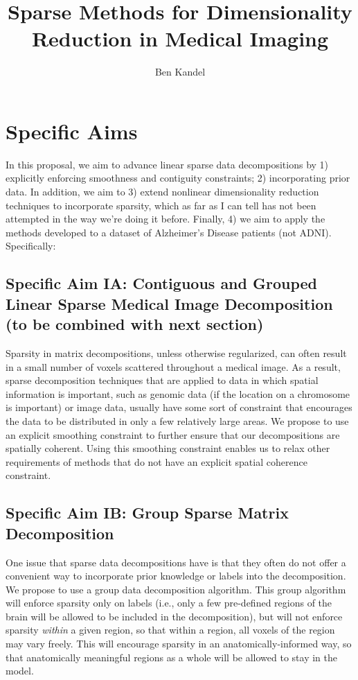 \documentclass{nih}
\date{}
\author{Ben Kandel}
\title{Sparse Methods for Dimensionality Reduction in Medical Imaging}
\begin{document}
\maketitle

\section*{Specific Aims}
In this proposal, we aim to advance linear sparse data decompositions by 1) explicitly enforcing smoothness and contiguity constraints; 2) incorporating prior data.  In addition, we aim to 3) extend nonlinear dimensionality reduction techniques to incorporate sparsity, which as far as I can tell has not been attempted in the way we're doing it before. Finally, 4) we aim to apply the methods developed to a dataset of Alzheimer's Disease patients (not ADNI).  Specifically:
 
\subsection*{Specific Aim IA: Contiguous and Grouped Linear Sparse Medical Image Decomposition (to be combined with next section)} 
Sparsity in matrix decompositions, unless otherwise regularized, can often result in a small number of voxels scattered throughout a medical image.  As a result, sparse decomposition techniques that are applied to data in which spatial information is important, such as genomic data (if the location on a chromosome is important) or image data, usually have some sort of constraint that encourages the data to be distributed in only a few relatively large areas.  We propose to use an explicit smoothing constraint to further ensure that our decompositions are spatially coherent.  Using this smoothing constraint enables us to relax other requirements of methods that do not have an explicit spatial coherence constraint. 
\subsection*{Specific Aim IB: Group Sparse Matrix Decomposition}
One issue that sparse data decompositions have is that they often do not offer a convenient way to incorporate prior knowledge or labels into the decomposition.  We propose to use a group data decomposition algorithm.  This group algorithm will enforce sparsity only on labels (i.e., only a few pre-defined regions of the brain will be allowed to be included in the decomposition), but will not enforce sparsity \textit{within} a given region, so that within a region, all voxels of the region may vary freely.  This will encourage sparsity in an anatomically-informed way, so that anatomically meaningful regions as a whole will be allowed to stay in the model. 
\end{document}

